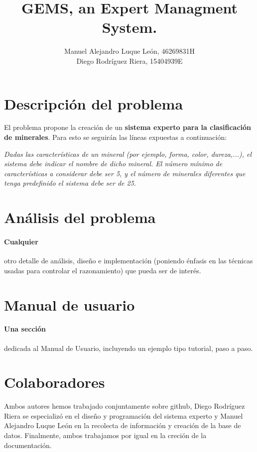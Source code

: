 \documentclass[a4paper,10pt]{article}
\title{GEMS, an Expert Managment System.}
\author{Manuel Alejandro Luque León, 46269831H\\Diego Rodríguez Riera, 15404939E}
\begin{document}
\maketitle
\pagebreak
\tableofcontents
\pagebreak

\section{Descripción del problema}
El problema propone la creación de un \textbf{sistema experto para la clasificación de minerales}. Para esto se seguirán las líneas expuestas a continuación:

\textit{Dadas las características de un mineral (por ejemplo, forma, color, dureza,...), el sistema debe indicar el nombre de dicho mineral.  El número mínimo de características a considerar debe ser 5, y el número de minerales diferentes que tenga predefinido el sistema debe ser de 25.}
\pagebreak


\section{Análisis del problema}
\paragraph{Cualquier} otro detalle de análisis, diseño e implementación (poniendo énfasis en las técnicas usadas para controlar el razonamiento) que pueda ser de interés.
\pagebreak


\section{Manual de usuario}
\paragraph{Una sección} dedicada al Manual de Usuario, incluyendo un ejemplo tipo tutorial, paso a paso.


\section{Colaboradores}
Ambos autores hemos trabajado conjuntamente sobre github, Diego Rodríguez Riera se especializó en el diseño y programación del sistema experto y Manuel Alejandro Luque León en la recolecta de información y creación de la base de datos. Finalmente, ambos trabajamos por igual en la creción de la documentación.
\pagebreak

\nocite{*}



\end{document}

